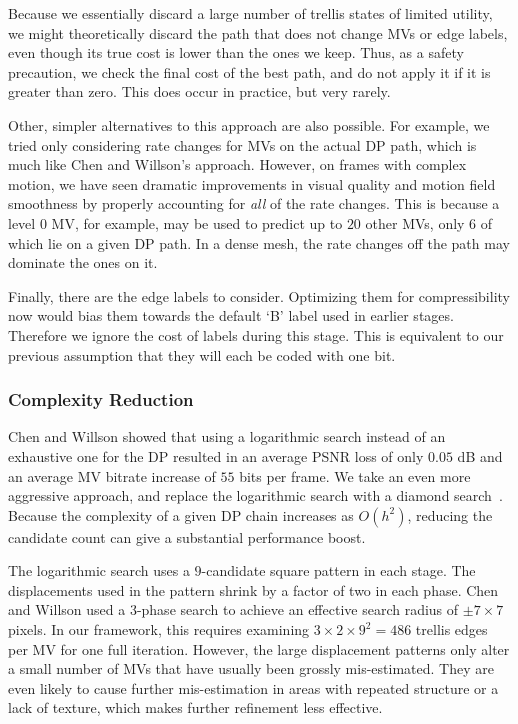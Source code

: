 \documentclass[11pt,letterpaper]{article}
\begin{document}
Because we essentially discard a large number of trellis states of limited
 utility, we might theoretically discard the path that does not change MVs or
 edge labels, even though its true cost is lower than the ones we keep.
Thus, as a safety precaution, we check the final cost of the best path, and do
 not apply it if it is greater than zero.
This does occur in practice, but very rarely.

Other, simpler alternatives to this approach are also possible.
For example, we tried only considering rate changes for MVs on the actual DP
 path, which is much like Chen and Willson's approach.
However, on frames with complex motion, we have seen dramatic improvements in
 visual quality and motion field smoothness by properly accounting for
 \textit{all} of the rate changes.
This is because a level $0$ MV, for example, may be used to predict up to $20$
 other MVs, only $6$ of which lie on a given DP path.
In a dense mesh, the rate changes off the path may dominate the ones on it.

Finally, there are the edge labels to consider.
Optimizing them for compressibility now would bias them towards the default `B'
 label used in earlier stages.
Therefore we ignore the cost of labels during this stage.
This is equivalent to our previous assumption that they will each be coded with
 one bit.

\subsubsection{Complexity Reduction}

Chen and Willson showed that using a logarithmic search instead of an
 exhaustive one for the DP resulted in an average PSNR loss of only $0.05$ dB
 and an average MV bitrate increase of $55$ bits per frame.
We take an even more aggressive approach, and replace the logarithmic search
 with a diamond search~\cite{ZM00}.
Because the complexity of a given DP chain increases as $O(h^2)$, reducing the
 candidate count can give a substantial performance boost.

The logarithmic search uses a $9$-candidate square pattern in each stage.
The displacements used in the pattern shrink by a factor of two in each phase.
Chen and Willson used a 3-phase search to achieve an effective search radius of
 $\pm 7\times 7$ pixels.
In our framework, this requires examining $3\times 2\times 9^2=486$ trellis
 edges per MV for one full iteration.
However, the large displacement patterns only alter a small number of MVs that
 have usually been grossly mis-estimated.
They are even likely to cause further mis-estimation in areas with repeated
 structure or a lack of texture, which makes further refinement less effective.
\end{document}
